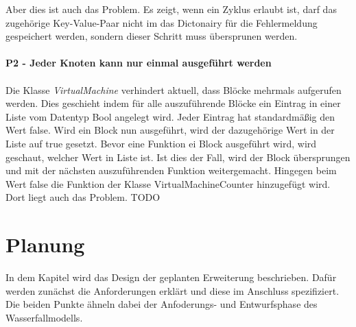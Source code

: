         Aber dies ist auch das Problem. 
        Es zeigt, wenn ein Zyklus erlaubt ist, darf das zugehörige Key-Value-Paar nicht im das Dictonairy für die Fehlermeldung gespeichert werden, sondern dieser Schritt muss übersprunen werden.\\
        \\
        \textbf{P2 - Jeder Knoten kann nur einmal ausgeführt werden}\\
        \\
        Die Klasse \textit{VirtualMachine} verhindert aktuell, dass Blöcke mehrmals aufgerufen werden.
        Dies geschieht indem für alle auszuführende Blöcke ein Eintrag in einer Liste vom Datentyp Bool angelegt wird.
        Jeder Eintrag hat standardmäßig den Wert false. 
        Wird ein Block nun ausgeführt, wird der dazugehörige Wert in der Liste auf true gesetzt.
        Bevor eine Funktion ei Block ausgeführt wird, wird geschaut, welcher Wert in Liste ist.
        Ist dies der Fall, wird der Block übersprungen und mit der nächsten auszuführenden Funktion weitergemacht.
        Hingegen beim Wert false die Funktion der Klasse VirtualMachineCounter hinzugefügt wird.
        Dort liegt auch das Problem.
        TODO
    \newpage
    \chapter{Planung}
    In dem Kapitel wird das Design der geplanten Erweiterung beschrieben. 
    Dafür werden zunächst die Anforderungen erklärt und diese im Anschluss spezifiziert.
    Die beiden Punkte ähneln dabei der Anfoderungs- und Entwurfsphase des Wasserfallmodells.
